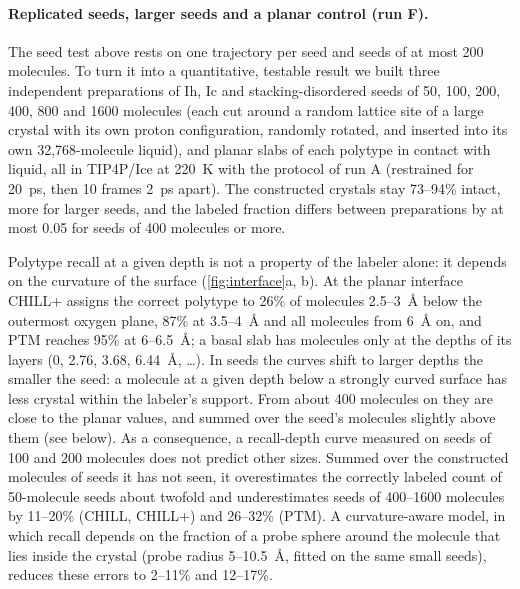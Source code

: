 \documentclass[11pt,a4paper]{article}
\begin{document}
\paragraph{Replicated seeds, larger seeds and a planar control (run F).}\label{sec:interface}
The seed test above rests on one trajectory per seed and seeds of at most 200
molecules. To turn it into a quantitative, testable result we built three
independent preparations of Ih, Ic and stacking-disordered seeds of 50, 100,
200, 400, 800 and 1600 molecules (each cut around a random lattice site of a
large crystal with its own proton configuration, randomly rotated, and
inserted into its own 32,768-molecule liquid), and planar slabs of each
polytype in contact with liquid, all in TIP4P/Ice at 220~K with the
protocol of run A (restrained for 20~ps, then 10 frames 2~ps apart). The
constructed crystals stay 73--94\% intact, more for larger seeds, and the
labeled fraction differs between preparations by at most 0.05 for seeds of 400
molecules or more.

Polytype recall at a given depth is not a property of the labeler alone: it
depends on the curvature of the surface (\cref{fig:interface}a, b). At the
planar interface CHILL+ assigns the correct polytype to 26\% of molecules
2.5--3~\AA{} below the outermost oxygen plane, 87\% at 3.5--4~\AA{} and all
molecules from 6~\AA{} on, and PTM reaches 95\% at 6--6.5~\AA; a basal slab
has molecules only at the depths of its layers (0, 2.76, 3.68, 6.44~\AA,
\dots). In seeds the curves shift to larger depths the smaller the seed: a
molecule at a given depth below a strongly curved surface has less crystal
within the labeler's support. From about 400 molecules on they are close to
the planar values, and summed over the seed's molecules slightly above them
(see below). As a consequence, a recall-depth curve measured on seeds of 100 and 200 molecules
does not predict other sizes. Summed over the constructed molecules of seeds
it has not seen, it overestimates the correctly labeled count of 50-molecule
seeds about twofold and underestimates seeds of 400--1600 molecules by
11--20\% (CHILL, CHILL+) and 26--32\% (PTM). A curvature-aware model, in
which recall depends on the fraction of a probe sphere around the molecule
that lies inside the crystal (probe radius 5--10.5~\AA, fitted on the same
small seeds), reduces these errors to 2--11\% and 12--17\%.
\end{document}
